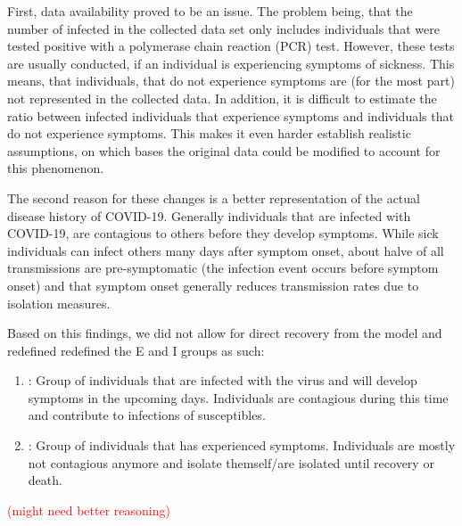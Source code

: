 \par
First, data availability proved to be an issue. The problem being, that the number of infected in the
collected data set only includes individuals that were tested positive with a polymerase chain reaction (PCR) test\cite{??}. However,
these tests are usually conducted, if an individual is experiencing symptoms of sickness\cite{??}. This means, that individuals, that do
not experience symptoms are (for the most part) not represented in the collected data. In addition, it is difficult to estimate
the ratio between infected individuals that experience symptoms and individuals that do not experience symptoms. This makes it
even harder establish realistic assumptions, on which bases the original data could be modified to account for this phenomenon.\newline

\par
The second reason for these changes is a better representation of the actual disease history of COVID-19. Generally individuals that
are infected with COVID-19, are contagious to others before they develop symptoms. While sick individuals can infect others many
days after symptom onset, about halve of all transmissions are pre-symptomatic (the infection event occurs before symptom onset)
\cite{casey2021presymptomatic} and that symptom onset generally reduces transmission rates due to isolation measures\cite{RKIcov}.

\par
Based on this findings, we did not allow for direct recovery from the model and redefined redefined the E and I groups as such: 
\begin{enumerate}[label=$\bullet$]
	\item {}: Group of individuals that are infected with the virus and will develop symptoms in the upcoming
		days. Individuals are contagious during this time and contribute to infections of susceptibles.
	\item {}: Group of individuals that has experienced symptoms. Individuals are mostly not contagious anymore
		and isolate themself/are isolated until recovery or death.
\end{enumerate}

\textcolor{red}{(might need better reasoning)} %


